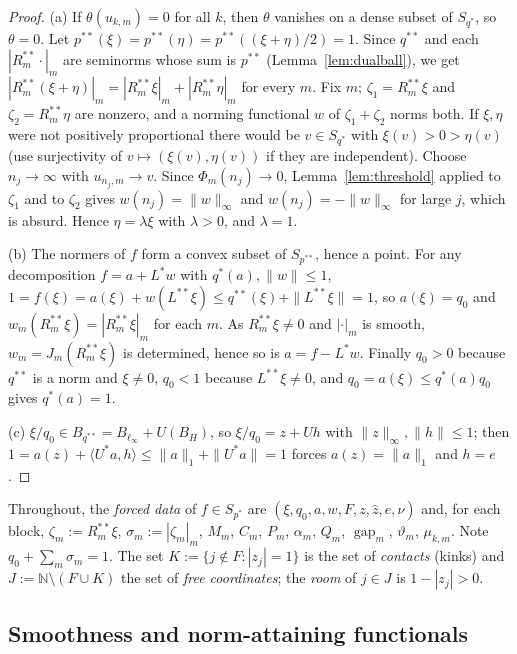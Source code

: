 \documentclass[10pt]{amsart}
\theoremstyle{definition}
\theoremstyle{remark}
\newcommand{\N}{\mathbb N}
\newcommand{\gap}{\operatorname{gap}}
\newcommand{\zh}{\hat z}
\newcommand{\ip}[2]{\langle #1,#2\rangle}
\begin{document}
\begin{proof}
(a) If $\theta(u_{k,m})=0$ for all $k$, then $\theta$ vanishes on a dense
subset of $S_{q^*}$, so $\theta=0$.  Let
$p^{**}(\xi)=p^{**}(\eta)=p^{**}((\xi+\eta)/2)=1$.  Since $q^{**}$ and each
$|R_m^{**}\cdot|_m$ are seminorms whose sum is $p^{**}$
(Lemma~\ref{lem:dualball}), we get
$|R_m^{**}(\xi+\eta)|_m=|R_m^{**}\xi|_m+|R_m^{**}\eta|_m$ for every $m$.
Fix $m$; $\zeta_1=R_m^{**}\xi$ and $\zeta_2=R_m^{**}\eta$ are nonzero, and a
norming functional $w$ of $\zeta_1+\zeta_2$ norms both.  If $\xi,\eta$ were
not positively proportional there would be $v\in S_{q^*}$ with
$\xi(v)>0>\eta(v)$ (use surjectivity of $v\mapsto(\xi(v),\eta(v))$ if they
are independent).  Choose $n_j\to\infty$ with $u_{n_j,m}\to v$.  Since
$\Phi_m(n_j)\to0$, Lemma~\ref{lem:threshold} applied to $\zeta_1$ and to
$\zeta_2$ gives $w(n_j)=\|w\|_\infty$ and $w(n_j)=-\|w\|_\infty$ for large
$j$, which is absurd.  Hence $\eta=\lambda\xi$ with $\lambda>0$, and
$\lambda=1$.

(b) The normers of $f$ form a convex subset of $S_{p^{**}}$, hence a point.
For any decomposition $f=a+L^*w$ with $q^*(a),\|w\|\le1$,
$1=f(\xi)=a(\xi)+w(L^{**}\xi)\le q^{**}(\xi)+\|L^{**}\xi\|=1$, so
$a(\xi)=q_0$ and $w_m(R_m^{**}\xi)=|R_m^{**}\xi|_m$ for each $m$.  As
$R_m^{**}\xi\ne0$ and $|\cdot|_m$ is smooth, $w_m=J_m(R_m^{**}\xi)$ is
determined, hence so is $a=f-L^*w$.  Finally $q_0>0$ because $q^{**}$ is a norm and
$\xi\ne0$, $q_0<1$ because $L^{**}\xi\ne0$, and
$q_0=a(\xi)\le q^*(a)q_0$ gives $q^*(a)=1$.

(c) $\xi/q_0\in B_{q^{**}}=B_{\ell_\infty}+U(B_H)$, so $\xi/q_0=z+Uh$ with
$\|z\|_\infty,\|h\|\le1$; then $1=a(z)+\ip{U^*a}{h}\le\|a\|_1+\|U^*a\|=1$
forces $a(z)=\|a\|_1$ and $h=e$.
\end{proof}

Throughout, the \emph{forced data} of $f\in S_{p^*}$ are
$(\xi,q_0,a,w,F,z,\zh,e,\nu)$ and, for each block,
$\zeta_m:=R_m^{**}\xi$, $\sigma_m:=|\zeta_m|_m$, $M_m$, $C_m$, $P_m$,
$\alpha_m$, $Q_m$, $\gap_m$, $\vartheta_m$, $\mu_{k,m}$.  Note
$q_0+\sum_m\sigma_m=1$.  The set $K:=\{j\notin F:|z_j|=1\}$ is the set of
\emph{contacts} (kinks) and $J:=\N\setminus(F\cup K)$ the set of
\emph{free coordinates}; the \emph{room} of $j\in J$ is $1-|z_j|>0$.

\subsection{Smoothness and norm-attaining functionals}
\end{document}
